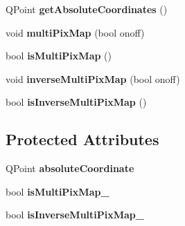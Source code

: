 \begin{DoxyCompactItemize}
\item 
\hypertarget{class_student_1_1_menu_object_a4fd9afac37622835c16051872170f28f}{Q\-Point {\bfseries get\-Absolute\-Coordinates} ()}\label{class_student_1_1_menu_object_a4fd9afac37622835c16051872170f28f}

\item 
\hypertarget{class_student_1_1_menu_object_a2004d4e6aad0390f604e95321a3a1bee}{void {\bfseries multi\-Pix\-Map} (bool onoff)}\label{class_student_1_1_menu_object_a2004d4e6aad0390f604e95321a3a1bee}

\item 
\hypertarget{class_student_1_1_menu_object_add43b727d38b5f75830c796598f76c01}{bool {\bfseries is\-Multi\-Pix\-Map} ()}\label{class_student_1_1_menu_object_add43b727d38b5f75830c796598f76c01}

\item 
\hypertarget{class_student_1_1_menu_object_a22daa54582c31efdf70766ebc3e25b20}{void {\bfseries inverse\-Multi\-Pix\-Map} (bool onoff)}\label{class_student_1_1_menu_object_a22daa54582c31efdf70766ebc3e25b20}

\item 
\hypertarget{class_student_1_1_menu_object_a4f6cdc3b505a898d07a3e713aa8cf7d1}{bool {\bfseries is\-Inverse\-Multi\-Pix\-Map} ()}\label{class_student_1_1_menu_object_a4f6cdc3b505a898d07a3e713aa8cf7d1}

\end{DoxyCompactItemize}
\subsection*{Protected Attributes}
\begin{DoxyCompactItemize}
\item 
\hypertarget{class_student_1_1_menu_object_a023ca29bf38a143071daa2972a865877}{Q\-Point {\bfseries absolute\-Coordinate}}\label{class_student_1_1_menu_object_a023ca29bf38a143071daa2972a865877}

\item 
\hypertarget{class_student_1_1_menu_object_a215dcc249c14a2eb7bc74b7909221ddc}{bool {\bfseries is\-Multi\-Pix\-Map\-\_\-}}\label{class_student_1_1_menu_object_a215dcc249c14a2eb7bc74b7909221ddc}

\item 
\hypertarget{class_student_1_1_menu_object_ad8b206a5994510e917f5c16c9eac4eb6}{bool {\bfseries is\-Inverse\-Multi\-Pix\-Map\-\_\-}}\label{class_student_1_1_menu_object_ad8b206a5994510e917f5c16c9eac4eb6}

\end{DoxyCompactItemize}
